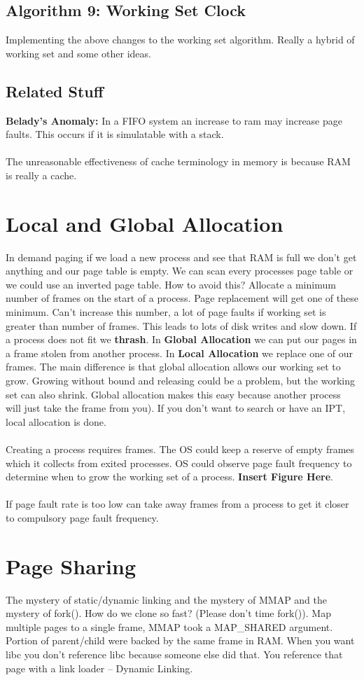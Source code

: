 \documentclass[../base_file/cs1550_notes.tex]{subfiles}
\begin{document}
\subsection{Algorithm 9: Working Set Clock}
Implementing the above changes to the working set algorithm.  Really a hybrid of working set and some other ideas.
\subsection{Related Stuff}
\textbf{Belady's Anomaly:}  In a FIFO system an increase to ram may increase page faults.  This occurs if it is simulatable with a stack.\\\\
The unreasonable effectiveness of cache terminology in memory is because RAM is really a cache.
\section{Local and Global Allocation}
In demand paging if we load a new process and see that RAM is full we don't get anything and our page table is empty.  We can scan every
processes page table or we could use an inverted page table.  How to avoid this?  Allocate a minimum number of frames on the start of a 
process.  Page replacement will get one of these minimum.  Can't increase this number, a lot of page faults if working set is greater than
number of frames.  This leads to lots of disk writes and slow down.  If a process does not fit we \textbf{thrash}.  In \textbf{Global
Allocation} we can put our pages in a frame stolen from another process.  In \textbf{Local Allocation} we replace one of our frames.  The
main difference is that global allocation allows our working set to grow.  Growing without bound and releasing could be a problem, but the
working set can also shrink.  Global allocation makes this easy  because another process will just take the frame from you).  If you don't
want to search or have an IPT, local allocation is done.\\\\
Creating a process requires frames.  The OS could keep a reserve of empty frames which it collects from exited processes.  OS could observe
page fault frequency to determine when to grow the working set of a process. \textbf{Insert Figure Here}.\\\\
If page fault rate is too low can take away frames from a process to get it closer to compulsory page fault frequency.
\section{Page Sharing}
The mystery of static/dynamic linking and the mystery of MMAP and the mystery of fork().  How do we clone so fast? (Please don't time fork()).
Map multiple pages to a single frame, MMAP took a MAP\_SHARED argument.  Portion of parent/child were backed by the same frame in RAM.
When  you want libc you don't reference libc because someone else did that.  You reference that page with a link loader -- Dynamic Linking.
\end{document}
